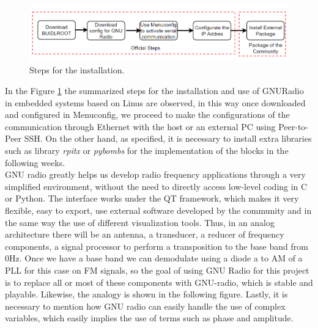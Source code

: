 \documentclass[12pt, twoside]{report}
\begin{document}
\begin{figure}[!h]
\centering
  \includegraphics[width=\linewidth]{images/Steps1.png}
  \caption{Steps for the installation.}
  \label{fig:steps1}
\end{figure}
In the Figure \ref{fig:steps1} the summarized steps for the installation and use of GNURadio in embedded systems based on Linus are observed, in this way once downloaded and configured in Menuconfig, we proceed to make the configurations of the communication through Ethernet with the host or an external PC using Peer-to-Peer SSH. On the other hand, as specified, it is necessary to install extra libraries such as library \textit{rpitx} or \textit{pybombs} for the implementation of the blocks in the following weeks.\\
\newline
GNU radio greatly helps us develop radio frequency applications through a very simplified environment, without the need to directly access low-level coding in C or Python. The interface works under the QT framework, which makes it very flexible, easy to export, use external software developed by the community and in the same way the use of different visualization tools.
Thus, in an analog architecture there will be an antenna, a transducer, a reducer of frequency components, a signal processor to perform a transposition to the base band from 0Hz. Once we have a base band we can demodulate using a diode a to AM of a PLL for this case on FM signals, so the goal of using GNU Radio for this project is to replace all or most of these components with GNU-radio, which is stable and playable. Likewise, the analogy is shown in the following figure. Lastly, it is necessary to mention how GNU radio can easily handle the use of complex variables, which easily implies the use of terms such as phase and amplitude.
\end{document}
